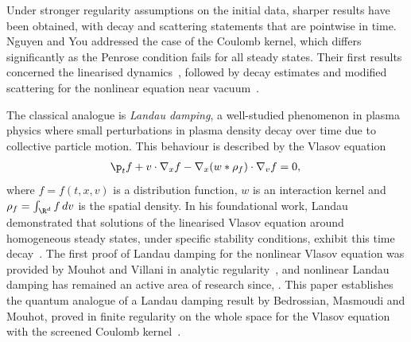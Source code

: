 Under stronger regularity assumptions on the initial data, sharper results have been obtained, with decay and scattering statements that are pointwise in time. Nguyen and You addressed the case of the Coulomb kernel, which differs significantly as the Penrose condition fails for all steady states. Their first results concerned the linearised dynamics~\cite{NguyenYou2023}, followed by decay estimates and modified scattering for the nonlinear equation near vacuum~\cite{NguyenYou2024}.

The classical analogue is \textit{Landau damping}, a well-studied phenomenon in plasma physics where small perturbations in plasma density decay over time due to collective particle motion. This behaviour is described by the Vlasov equation
\begin{align}\label{VP}
\p_tf+v\cdot\nabla_xf-\nabla_x(w*\rho_f)\cdot\nabla_vf=0,\vphantom{2_B}
\end{align}where $f=f(t,x,v)$ is a distribution function, $w$ is an interaction kernel and $\rho_f=\int_{\R^d} f\,dv$ is the spatial density. In his foundational work, Landau demonstrated that solutions of the linearised Vlasov equation around homogeneous steady states, under specific stability conditions, exhibit this time decay~\cite{Landaupaper1946}. The first proof of Landau damping for the nonlinear Vlasov equation was provided by Mouhot and Villani in analytic regularity~\cite{mou-vil-2011}, and nonlinear Landau damping has remained an active area of research since, \eg \cite{bed-mas-mou-2016,BedrossianMasmoudiMouhot2018,GrenierNguyenRodnianski2021,BedrossianMasmoudiMouhot2022,IonescuPausaderWangWidmayer2024Poisson}. This paper establishes the quantum analogue of a Landau damping result by Bedrossian, Masmoudi and Mouhot, proved in finite regularity on the whole space for the Vlasov equation with the screened Coulomb kernel~\cite{BedrossianMasmoudiMouhot2018}.

